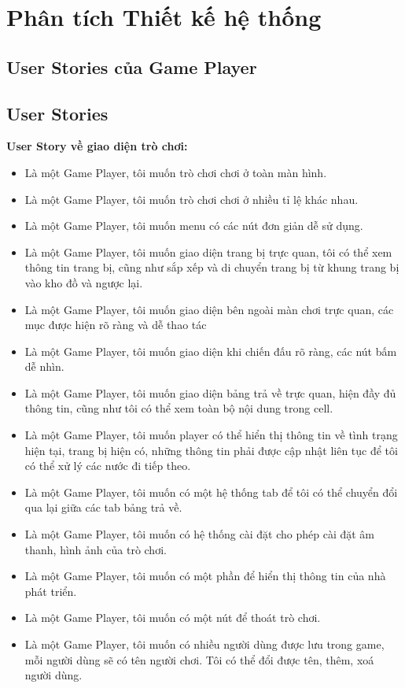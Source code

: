 \section{Phân tích Thiết kế hệ thống}

\subsection{User Stories của Game Player}
\subsection{User Stories}
\textbf{User Story về giao diện trò chơi:}
\begin{itemize}
	\item Là một Game Player, tôi muốn trò chơi chơi ở toàn màn hình.
	\item Là một Game Player, tôi muốn trò chơi chơi ở nhiều tỉ lệ khác nhau.
	\item Là một Game Player, tôi muốn menu có các nút đơn giản dễ sử dụng.
	\item Là một Game Player, tôi muốn giao diện trang bị trực quan, tôi có thể xem thông tin trang bị, cũng như sắp xếp và di chuyển trang bị từ khung trang bị vào kho đồ và ngược lại.
	\item Là một Game Player, tôi muốn giao diện bên ngoài màn chơi trực quan, các mục được hiện rõ ràng và dễ thao tác
	\item Là một Game Player, tôi muốn giao diện khi chiến đấu rõ ràng, các nút bấm dễ nhìn.
	\item Là một Game Player, tôi muốn giao diện bảng trả về trực quan, hiện đầy đủ thông tin, cũng như tôi có thể xem toàn bộ nội dung trong cell.
	\item Là một Game Player, tôi muốn player có thể hiển thị thông tin về tình trạng hiện tại, trang bị hiện có, những thông tin phải được cập nhật liên tục để tôi có thể xử lý các nước đi tiếp theo.
	\item Là một Game Player, tôi muốn có một hệ thống tab để tôi có thể chuyển đổi qua lại giữa các tab bảng trả về. 
	\item Là một Game Player, tôi muốn có hệ thống cài đặt cho phép cài đặt âm thanh, hình ảnh của trò chơi.
	\item Là một Game Player, tôi muốn có một phần để hiển thị thông tin của nhà phát triển.
	\item Là một Game Player, tôi muốn có một nút để thoát trò chơi.
	\item Là một Game Player, tôi muốn có nhiều người dùng được lưu trong game, mỗi người dùng sẽ có tên người chơi. Tôi có thể đổi được tên, thêm, xoá người dùng.
\end{itemize}
